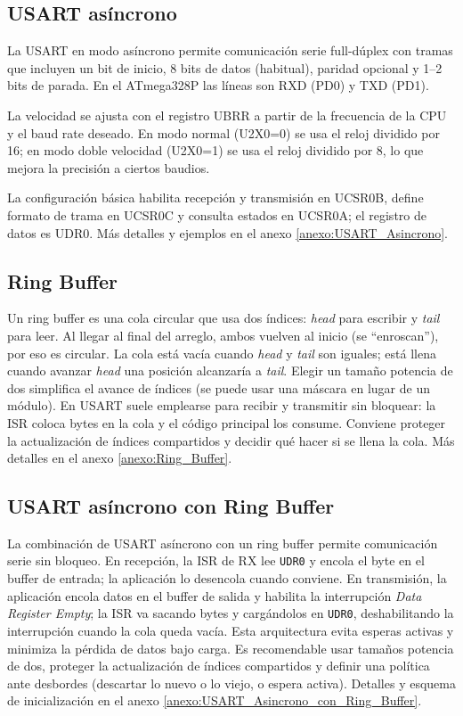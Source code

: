 \subsection{USART asíncrono}
La USART en modo asíncrono permite comunicación serie full-dúplex con tramas que incluyen un bit de inicio, 8 bits de datos (habitual), paridad opcional y 1–2 bits de parada. En el ATmega328P las líneas son RXD (PD0) y TXD (PD1).

La velocidad se ajusta con el registro UBRR a partir de la frecuencia de la CPU y el baud rate deseado. En modo normal (U2X0=0) se usa el reloj dividido por 16; en modo doble velocidad (U2X0=1) se usa el reloj dividido por 8, lo que mejora la precisión a ciertos baudios.

La configuración básica habilita recepción y transmisión en UCSR0B, define formato de trama en UCSR0C y consulta estados en UCSR0A; el registro de datos es UDR0. Más detalles y ejemplos en el anexo \ref{anexo:USART_Asincrono}.



\subsection{Ring Buffer}
Un ring buffer es una cola circular que usa dos índices: \textit{head} para escribir y \textit{tail} para leer. Al llegar al final del arreglo, ambos vuelven al inicio (se “enroscan”), por eso es circular. La cola está vacía cuando \textit{head} y \textit{tail} son iguales; está llena cuando avanzar \textit{head} una posición alcanzaría a \textit{tail}. Elegir un tamaño potencia de dos simplifica el avance de índices (se puede usar una máscara en lugar de un módulo). En USART suele emplearse para recibir y transmitir sin bloquear: la ISR coloca bytes en la cola y el código principal los consume. Conviene proteger la actualización de índices compartidos y decidir qué hacer si se llena la cola. Más detalles en el anexo \ref{anexo:Ring_Buffer}.



\subsection{USART asíncrono con Ring Buffer}
La combinación de USART asíncrono con un ring buffer permite comunicación serie sin bloqueo. En recepción, la ISR de RX lee \texttt{UDR0} y encola el byte en el buffer de entrada; la aplicación lo desencola cuando conviene. En transmisión, la aplicación encola datos en el buffer de salida y habilita la interrupción \textit{Data Register Empty}; la ISR va sacando bytes y cargándolos en \texttt{UDR0}, deshabilitando la interrupción cuando la cola queda vacía. Esta arquitectura evita esperas activas y minimiza la pérdida de datos bajo carga. Es recomendable usar tamaños potencia de dos, proteger la actualización de índices compartidos y definir una política ante desbordes (descartar lo nuevo o lo viejo, o espera activa). Detalles y esquema de inicialización en el anexo \ref{anexo:USART_Asincrono_con_Ring_Buffer}.


